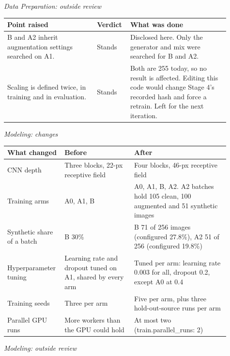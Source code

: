 \medskip

\textit{Data Preparation: outside review}

\begin{tabular}{p{0.38\linewidth}p{0.11\linewidth}p{0.42\linewidth}}
\toprule
Point raised & Verdict & What was done \\
\midrule
B and A2 inherit augmentation settings searched on A1. & Stands & Disclosed here. Only the generator and mix were searched for B and A2. \\
Scaling is defined twice, in training and in evaluation. & Stands & Both are 255 today, so no result is affected. Editing this code would change Stage 4's recorded hash and force a retrain. Left for the next iteration. \\
\bottomrule
\end{tabular}

\medskip

\textit{Modeling: changes}

\begin{tabular}{p{0.20\linewidth}p{0.30\linewidth}p{0.41\linewidth}}
\toprule
What changed & Before & After \\
\midrule
CNN depth & Three blocks, 22-px receptive field & Four blocks, 46-px receptive field \\
Training arms & A0, A1, B & A0, A1, B, A2. A2 batches hold 105 clean, 100 augmented and 51 synthetic images \\
Synthetic share of a batch & B 30\% & B 71 of 256 images (configured 27.8\%), A2 51 of 256 (configured 19.8\%) \\
Hyperparameter tuning & Learning rate and dropout tuned on A1, shared by every arm & Tuned per arm: learning rate 0.003 for all, dropout 0.2, except A0 at 0.4 \\
Training seeds & Three per arm & Five per arm, plus three hold-out-source runs per arm \\
Parallel GPU runs & More workers than the GPU could hold & At most two (train.parallel\_runs: 2) \\
\bottomrule
\end{tabular}

\medskip

\textit{Modeling: outside review}

